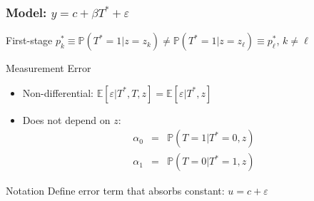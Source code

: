 \documentclass{beamer}
\begin{document}
%    
%
\begin{frame}
  \frametitle{Model: $y = c + \beta T^* + \varepsilon$}
  \begin{block}{First-stage}
    $p^*_k \equiv \mathbb{P}(T^*=1|z=z_k) \neq \mathbb{P}(T^*=1|z=z_\ell)\equiv p_\ell^*$, $k\neq \ell$
  \end{block}
  \begin{block}{Measurement Error}
    \begin{itemize}
      \item Non-differential: $\mathbb{E}[\varepsilon|T^*,T,z] =  \mathbb{E}[\varepsilon|T^*,z]$
      \item Does not depend on $z$:
\begin{eqnarray*}
 \alpha_0&=&  \mathbb{P}(T = 1| T^* = 0, z)  \\ 
 \alpha_1&=& \mathbb{P}(T = 0| T^* = 1, z) 
\end{eqnarray*}
    \end{itemize}
  \end{block}

  \begin{alertblock}{Notation}
  Define error term that absorbs constant: $u = c + \varepsilon$ 
  \end{alertblock}
\end{frame}
\end{document}
